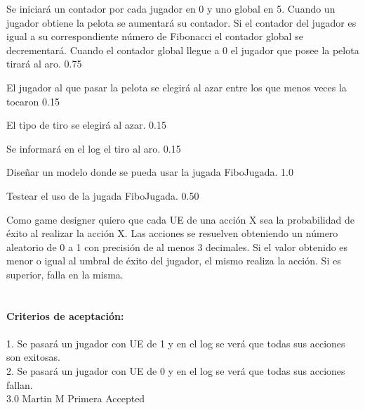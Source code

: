 		{Se iniciará un contador por cada jugador en 0 y uno global en 5. Cuando un jugador obtiene la pelota se aumentará su contador. Si el contador del jugador es igual a su correspondiente número de Fibonacci el contador global se decrementará. Cuando el contador global llegue a 0 el jugador que posee la pelota tirará al aro.} %
		{} %
		{0.75} %
		{} %
		{} %
		{} %

		{El jugador al que pasar la pelota se elegirá al azar entre los que menos veces la tocaron} %
		{} %
		{0.15} %
		{} %
		{} %
		{} %

		{El tipo de tiro se elegirá al azar.} %
		{} %
		{0.15} %
		{} %
		{} %
		{} %
		
		{Se informará en el log el tiro al aro.} %
		{} %
		{0.15} %
		{} %
		{} %
		{} %

		{Diseñar un modelo donde se pueda usar la jugada FiboJugada.} %
		{} %
		{1.0} %
		{} %
		{} %
		{} %


		{Testear el uso de la jugada FiboJugada.} %
		{} %
		{0.50} %
		{} %
		{} %
		{} %

\vspace{20pt}

	{Como game designer quiero que cada UE de una acci\'on X sea la probabilidad de \'exito al realizar la acci\'on X.} %
	{Las acciones se resuelven obteniendo un número aleatorio de 0 a 1 con precisión de al menos 3 decimales. Si el valor obtenido es menor o igual al umbral de éxito del jugador, el mismo realiza la acción. Si es superior, falla en la misma. \\
  \\
  \\
\textbf{Criterios de aceptación:}\\
  \\
1. Se pasará un jugador con UE de 1 y en el log se verá que todas sus acciones son exitosas. \\
2. Se pasará un jugador con UE de 0 y en el log se verá que todas sus acciones fallan. \\
} %
	{} %
	{3.0} %
	{Martin M} %
	{Primera} %
	{Accepted} %

